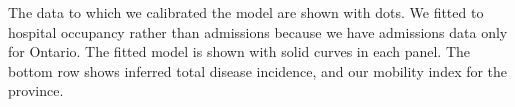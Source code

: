 \documentclass[12pt]{article}\usepackage[]{graphicx}\usepackage[]{color}
\begin{document}
The data to which we calibrated the model are shown with dots.
We fitted to hospital occupancy rather than admissions because
we have admissions data only for Ontario.  The fitted model
is shown with solid curves in each panel.
The bottom row shows inferred total disease incidence,
and
our mobility index for the province.

\FloatBarrier
\clearpage


\clearpage



\end{document}
